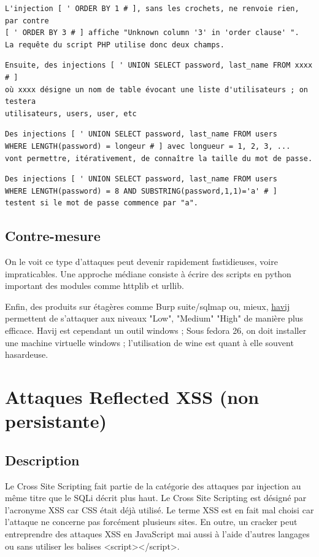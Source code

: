 \begin{verbatim}
L'injection [ ' ORDER BY 1 # ], sans les crochets, ne renvoie rien,  par contre 
[ ' ORDER BY 3 # ] affiche "Unknown column '3' in 'order clause' ". 
La requête du script PHP utilise donc deux champs.
\end{verbatim} 

\begin{verbatim}
Ensuite, des injections [ ' UNION SELECT password, last_name FROM xxxx # ]
où xxxx désigne un nom de table évocant une liste d'utilisateurs ; on testera
utilisateurs, users, user, etc
\end{verbatim} 

\begin{verbatim}
Des injections [ ' UNION SELECT password, last_name FROM users 
WHERE LENGTH(password) = longeur # ] avec longueur = 1, 2, 3, ... 
vont permettre, itérativement, de connaître la taille du mot de passe.
\end{verbatim} 

\begin{verbatim}
Des injections [ ' UNION SELECT password, last_name FROM users 
WHERE LENGTH(password) = 8 AND SUBSTRING(password,1,1)='a' # ] 
testent si le mot de passe commence par "a".
\end{verbatim} 
\subsection{Contre-mesure}

On le voit ce type d'attaques peut devenir rapidement fastidieuses, voire impraticables. Une approche médiane consiste à écrire des scripts en python important des modules comme httplib et urllib.

Enfin, des produits sur étagères comme Burp suite/sqlmap ou, mieux,   \href{www.itsecteam.com}{havij} permettent de s'attaquer aux niveaux "Low", "Medium" "High" de manière plus efficace. Havij est cependant un outil windows ; Sous fedora 26, on doit installer une machine virtuelle windows ;  l'utilisation de wine est quant à elle souvent hasardeuse.


\section{Attaques Reflected XSS (non persistante)}

\subsection{Description}
Le Cross Site Scripting fait partie de la catégorie des attaques par injection au même titre que le SQLi décrit plus haut. Le Cross Site Scripting est désigné par l'acronyme XSS car CSS était déjà utilisé. Le terme XSS est en fait mal choisi car l'attaque ne concerne pas forcément plusieurs sites. En outre, un cracker peut entreprendre des attaques XSS en JavaScript mai aussi à l'aide d’autres langages ou sans utiliser les balises <script></script>.

